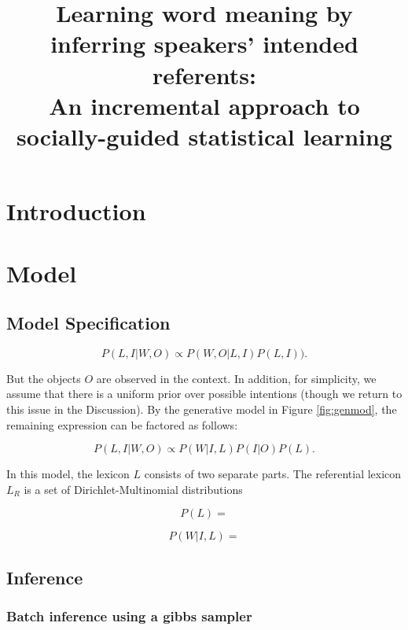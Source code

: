 \documentclass[man,noapacite]{apa2}
\title{Learning word meaning by inferring speakers' intended referents: \\ An incremental approach to socially-guided statistical learning}
\begin{document}
\maketitle                            


\section{Introduction}


\section{Model}

\subsection{Model Specification}

\begin{equation}
P(L, I| W, O) \propto P(W, O | L, I) P(L, I)).
\end{equation}

\noindent But the objects $O$ are observed in the context. In addition, for simplicity, we assume that there is a uniform prior over possible intentions (though we return to this issue in the Discussion). By the generative model in Figure \ref{fig:genmod}, the remaining expression can be factored as follows:

\begin{equation}
P(L, I| W, O) \propto P(W | I, L) P(I | O) P(L).
\end{equation}

In this model, the lexicon $L$ consists of two separate parts. The referential lexicon $L_R$ is a set of Dirichlet-Multinomial distributions

\begin{equation}
P(L) =
\end{equation}

\begin{equation}
P(W | I, L) =
\end{equation}


\subsection{Inference}

\subsubsection{Batch inference using a gibbs sampler}
\end{document}
